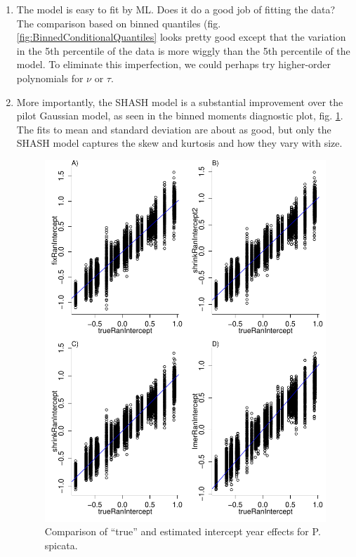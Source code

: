 \documentclass[11pt]{article}
\begin{document}
{\begin{enumerate}
\begin{figure}[tbp]
\centering
\caption{Binned data comparison of moments between simulations of the fitted SHASH model (grey, black) and the actual data (red) for 
{P. spicata}. Individuals were binned based on their initial size. }
\label{fig:BinnedConditionalMoments}
\end{figure} 

\item The model is easy to fit by ML. Does it do a good job of fitting the data? The comparison based on binned quantiles 
(fig. \ref{fig:BinnedConditionalQuantiles} looks pretty good except that the variation in the 5th percentile of the data
is more wiggly than the 5th percentile of the model. To eliminate this imperfection, we could perhaps try higher-order polynomials
for $\nu$ or $\tau$. 

\item More importantly, the SHASH model is a substantial improvement over the pilot Gaussian model, as seen in the
binned moments diagnostic plot, fig.  \ref{fig:BinnedConditionalMoments}. The fits to mean and standard deviation are
about as good, but only the SHASH model captures the skew and kurtosis and how they vary with size. 

\begin{figure}[tbp]
\centering
\includegraphics[width=.9\textwidth]{figures/PSSPShrinkageTest.pdf}
\caption{Comparison of ``true'' and estimated intercept year effects for {P. spicata}. }
\label{fig:ShrinkageTest}
\end{figure} 


\end{enumerate}}
\end{document}
